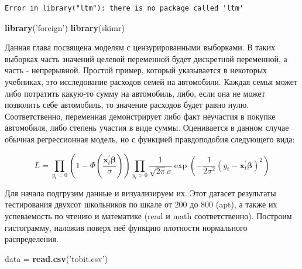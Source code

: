 \documentclass[]{book}
\newenvironment{Shaded}{\begin{snugshade}}{\end{snugshade}}
\newcommand{\KeywordTok}[1]{\textcolor[rgb]{0.13,0.29,0.53}{\textbf{#1}}}
\newcommand{\NormalTok}[1]{#1}
\newcommand{\StringTok}[1]{\textcolor[rgb]{0.31,0.60,0.02}{#1}}
\begin{document}
\begin{verbatim}
Error in library("ltm"): there is no package called 'ltm'
\end{verbatim}

\begin{Shaded}
\begin{Highlighting}[]
\KeywordTok{library}\NormalTok{(}\StringTok{'foreign'}\NormalTok{)}
\KeywordTok{library}\NormalTok{(skimr)}
\end{Highlighting}
\end{Shaded}

Данная глава посвящена моделям с цензурированными выборками. В таких выборках часть значений целевой переменной будет дискретной переменной, а часть - непрерывной. Простой пример, который указывается в некоторых учебниках, это исследование расходов семей на автомобили. Каждая семья может либо потратить какую-то сумму на автомобиль, либо, если она не может позволить себе автомобиль, то значение расходов будет равно нулю. Соответственно, переменная демонстрирует либо факт неучастия в покупке автомобиля, либо степень участия в виде суммы. Оценивается в данном случае обычная регрессионная модель, но с функцией правдоподобия следующего вида:

\begin{equation}
L=\prod_{y_{t}=0}\left(1-\Phi\left(\frac{\boldsymbol{x}_{t}^{\prime} \boldsymbol{\beta}}{\sigma}\right)\right) \prod_{y_{t}>0} \frac{1}{\sqrt{2 \pi} \sigma} \exp \left(-\frac{1}{2 \sigma^{2}}\left(y_{t}-\boldsymbol{x}_{t}^{\prime} \boldsymbol{\beta}\right)^{2}\right)
\end{equation}

Для начала подгрузим данные и визуализируем их. Этот датасет результаты тестирования двухсот школьников по шкале от 200 до 800 (apt), а также их успеваемость по чтению и математике (read и math соответственно). Построим гистограмму, наложив поверх неё функцию плотности нормального распределения.

\begin{Shaded}
\begin{Highlighting}[]
\NormalTok{data =}\StringTok{ }\KeywordTok{read.csv}\NormalTok{(}\StringTok{'tobit.csv'}\NormalTok{)}
\end{Highlighting}
\end{Shaded}
\end{document}
